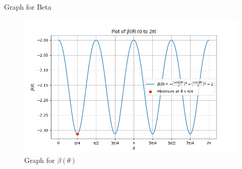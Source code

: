 \documentclass{beamer}
\providecommand{\brak}[1]{\ensuremath{\left(#1\right)}}
\theoremstyle{remark}
\begin{document}
\begin{frame}{Graph for Beta}
    \begin{figure}
    \centering
    \includegraphics[width=0.5\columnwidth]{figs/beta.png}
    \caption{Graph for $\beta\brak{\theta}$}
    \label{fig:placeholder}
\end{figure}
\end{frame}
\end{document}
